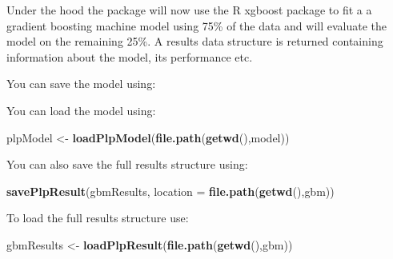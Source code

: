 \documentclass[
]{article}
\newenvironment{Shaded}{\begin{snugshade}}{\end{snugshade}}
\newcommand{\AttributeTok}[1]{\textcolor[rgb]{0.13,0.29,0.53}{#1}}
\newcommand{\FunctionTok}[1]{\textcolor[rgb]{0.13,0.29,0.53}{\textbf{#1}}}
\newcommand{\NormalTok}[1]{#1}
\newcommand{\OtherTok}[1]{\textcolor[rgb]{0.56,0.35,0.01}{#1}}
\newcommand{\SpecialCharTok}[1]{\textcolor[rgb]{0.81,0.36,0.00}{\textbf{#1}}}
\newcommand{\StringTok}[1]{\textcolor[rgb]{0.31,0.60,0.02}{#1}}
\begin{document}
Under the hood the package will now use the R xgboost package to fit a a
gradient boosting machine model using 75\% of the data and will evaluate
the model on the remaining 25\%. A results data structure is returned
containing information about the model, its performance etc.

You can save the model using:

\begin{Shaded}
\end{Shaded}

You can load the model using:

\begin{Shaded}
\begin{Highlighting}[]
\NormalTok{    plpModel }\OtherTok{\textless{}{-}} \FunctionTok{loadPlpModel}\NormalTok{(}\FunctionTok{file.path}\NormalTok{(}\FunctionTok{getwd}\NormalTok{(),}\StringTok{\textquotesingle{}model\textquotesingle{}}\NormalTok{))}
\end{Highlighting}
\end{Shaded}

You can also save the full results structure using:

\begin{Shaded}
\begin{Highlighting}[]
    \FunctionTok{savePlpResult}\NormalTok{(gbmResults, }\AttributeTok{location =} \FunctionTok{file.path}\NormalTok{(}\FunctionTok{getwd}\NormalTok{(),}\StringTok{\textquotesingle{}gbm\textquotesingle{}}\NormalTok{))}
\end{Highlighting}
\end{Shaded}

To load the full results structure use:

\begin{Shaded}
\begin{Highlighting}[]
\NormalTok{    gbmResults }\OtherTok{\textless{}{-}} \FunctionTok{loadPlpResult}\NormalTok{(}\FunctionTok{file.path}\NormalTok{(}\FunctionTok{getwd}\NormalTok{(),}\StringTok{\textquotesingle{}gbm\textquotesingle{}}\NormalTok{))}
\end{Highlighting}
\end{Shaded}
\end{document}
